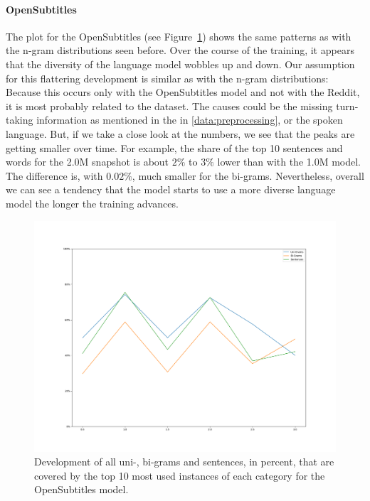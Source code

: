 \paragraph{OpenSubtitles} The plot for the OpenSubtitles (see Figure~\ref{results:language_model:diversity:opensubtitles}) shows the same patterns as with the n-gram distributions seen before. Over the course of the training, it appears that the diversity of the language model wobbles up and down. Our assumption for this flattering development is similar as with the n-gram distributions:  Because this occurs only with the OpenSubtitles model and not with the Reddit, it is most probably related to the dataset. The causes could be the missing turn-taking information  as mentioned in the in \ref{data:preprocessing}, or the spoken language. But, if we take a close look at the numbers, we see that the peaks are getting smaller over time. For example, the share of the top 10 sentences and words for the 2.0M snapshot is about $2\%$ to $3\%$ lower than with the 1.0M model. The difference is, with $0.02\%$, much smaller for the bi-grams. Nevertheless, overall we can see a tendency that the model starts to use a more diverse language model the longer the training advances.

\begin{figure}[H]
	\includegraphics[width=\linewidth]{img/plots/opensubtitles_not_reversed/diversity_perc_plot.png}
	\caption{Development of all uni-, bi-grams and sentences, in percent, that are covered by the top 10 most used instances of each category for the OpenSubtitles model.}
	\label{results:language_model:diversity:opensubtitles}
\end{figure}

